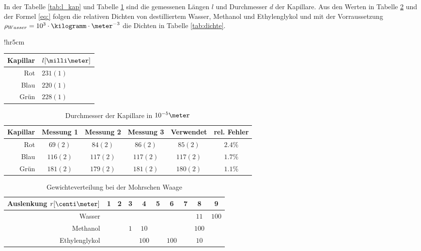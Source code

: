 \documentclass[12pt, a4paper, twoside]{scrartcl}
\begin{document}
In der Tabelle \ref{tab:l_kap} und Tabelle \ref{tab:d_kap} sind die gemessenen Längen $l$ und Durchmesser $d$ der Kapillare.
Aus den Werten in Tabelle \ref{tab:mohrsche_waage} und der Formel \eqref{eq:} folgen die relativen Dichten von destilliertem Wasser, Methanol und Ethylenglykol und mit der Vorraussetzung $\rho _{Wasser} = 10^{3}\cdot\kilogramm\cdot\meter^{-3}$ die Dichten in Tabelle \ref{tab:dichte}.

\begin{wraptable}{!hr}{5cm}
\centering
\begin{tabular}{r|l}
    Kapillar & $l[\milli\meter]$\\
    \hline
    Rot & $231(1)$\\
    Blau & $220(1)$\\
    Grün & $228(1)$\\
    
 \end{tabular} 
 \caption{\label{tab:l_kap}Länge $l$ der Kapillare}
\end{wraptable}

\begin{table}
\centering
\begin{tabular}{r|c|c|c||c|c}
    Kapillar & Messung 1 & Messung 2 & Messung 3 & Verwendet & rel. Fehler\\
    \hline
    Rot & $69(2)$ & $84(2)$ & $86(2)$ & $85(2)$ & $ 2.4\%$\\
    Blau & $116(2)$ & $117(2)$ & $117(2)$ & $117(2)$ & $ 1.7\%$\\
    Grün & $181(2)$ & $179(2)$ & $181(2)$ & $180(2)$ & $ 1.1\%$\\
    
 \end{tabular} 
 \caption{\label{tab:d_kap} Durchmesser der Kapillare in $ 10^{-5} \meter$}
\end{table}

\begin{table}
\centering
\begin{tabular}{r|c|c|c|c|c|c|c|c|c}
    Auslenkung $r[\centi\meter]$ & 1 & 2 & 3 & 4 & 5 & 6 & 7 & 8 & 9\\
    \hline
    \hline
    Wasser & & & & & & & & $11$ & $100$ \\
    \hline
    Methanol & & & $1$ & $10$ & & & & $100$ & \\
    \hline
    Ethylenglykol & & & & $100$ & & $100$ & & $10$ & \\
    
 \end{tabular} 
 \caption{\label{tab:mohrsche_waage}Gewichteverteilung bei der Mohrschen Waage}
\end{table}
\end{document}
